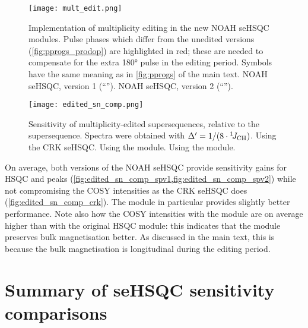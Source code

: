 \begin{figure}
    \centering
    \texttt{[image: mult\_edit.png]}
    {\label{fig:mult_edit_spv1}}
    {\label{fig:mult_edit_spv2}}
    \caption{
        Implementation of multiplicity editing in the new NOAH seHSQC modules.
        Pulse phases which differ from the unedited versions (\cref{fig:pprogs_prodop}) are highlighted in red; these are needed to compensate for the extra \proton{} \ang{180} pulse in the editing period.
        Symbols have the same meaning as in \cref{fig:pprogs} of the main text.
        \textbf{} NOAH seHSQC, version 1 (``\noahSpa{}'').
        \textbf{} NOAH seHSQC, version 2 (``\noahSpb{}'').
    }
    \label{fig:mult_edit}
\end{figure}

\begin{figure}
    \centering
    \texttt{[image: edited\_sn\_comp.png]}
    {\label{fig:edited_sn_comp_crk}}
    {\label{fig:edited_sn_comp_spv1}}
    {\label{fig:edited_sn_comp_spv2}}
    \caption{
        Sensitivity of multiplicity-edited  supersequences, relative to the  supersequence.
        Spectra were obtained with $\Delta' = 1/(8\cdot\onejch)$.
        \textbf{} Using the CRK seHSQC.
        \textbf{} Using the \noahSpa{} module.
        \textbf{} Using the \noahSpb{} module.
        \andro{}
    }
    \label{fig:edited_sn_comp}
\end{figure}

On average, both versions of the NOAH seHSQC provide sensitivity gains for HSQC  and  peaks (\cref{fig:edited_sn_comp_spv1,fig:edited_sn_comp_spv2}) while not compromising the COSY intensities as the CRK seHSQC does (\cref{fig:edited_sn_comp_crk}).
The \noahSpb{} module in particular provides slightly better performance.
Note also how the COSY intensities with the \noahSpb{} module are on average higher than with the original HSQC module: this indicates that the \noahSpb{} module preserves bulk  magnetisation better.
As discussed in the main text, this is because the bulk magnetisation is longitudinal during the editing period.

\section{Summary of \texorpdfstring{\carbon{}}{13C} seHSQC sensitivity comparisons}

